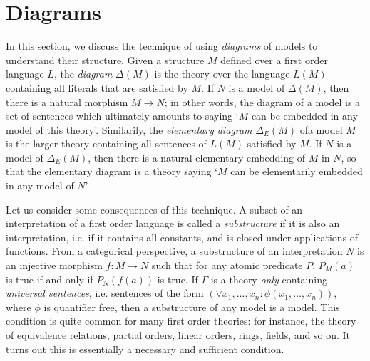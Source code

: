 \section{Diagrams}

In this section, we discuss the technique of using \emph{diagrams} of models to understand their structure. Given a structure $M$ defined over a first order language $L$, the \emph{diagram} $\Delta(M)$ is the theory over the language $L(M)$ containing all literals that are satisfied by $M$. If $N$ is a model of $\Delta(M)$, then there is a natural morphism $M \to N$; in other words, the diagram of a model is a set of sentences which ultimately amounts to saying `$M$ can be embedded in any model of this theory'. Similarily, the \emph{elementary diagram} $\Delta_E(M)$ ofa  model $M$ is the larger theory containing all sentences of $L(M)$ satisfied by $M$. If $N$ is a model of $\Delta_E(M)$, then there is a natural elementary embedding of $M$ in $N$, so that the elementary diagram is a theory saying `$M$ can be elementarily embedded in any model of $N$'.

Let us consider some consequences of this technique. A subset of an interpretation of a first order language is called a \emph{substructure} if it is also an interpretation, i.e. if it contains all constants, and is closed under applications of functions. From a categorical perspective, a substructure of an interpretation $N$ is an injective morphism $f: M \to N$ such that for any atomic predicate $P$, $P_M(a)$ is true if and only if $P_N(f(a))$ is true. If $\Gamma$ is a theory \emph{only} containing \emph{universal sentences}, i.e. sentences of the form $(\forall x_1,\dots,x_n: \phi(x_1,\dots,x_n))$, where $\phi$ is quantifier free, then a substructure of any model is a model. This condition is quite common for many first order theories: for instance, the theory of equivalence relations, partial orders, linear orders, rings, fields, and so on. It turns out this is essentially a necessary and sufficient condition.

